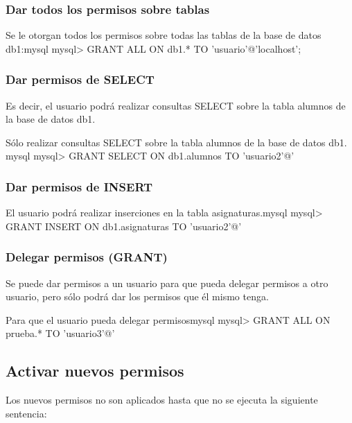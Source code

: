 \subsubsection*{Dar todos los permisos sobre tablas}

\begin{mycode}{Se le otorgan todos los permisos sobre todas las tablas de la base de datos db1:}{mysql}{}
mysql> GRANT ALL ON db1.* TO 'usuario'@'localhost';
\end{mycode}


\subsubsection*{Dar permisos de SELECT}

Es decir, el usuario podrá realizar consultas SELECT sobre la tabla alumnos de la base de datos db1.

\begin{mycode}{Sólo realizar consultas SELECT sobre la tabla alumnos de la base de datos db1.
    }{mysql}{}
mysql> GRANT SELECT ON db1.alumnos TO 'usuario2'@'%
\end{mycode}


\subsubsection*{Dar permisos de INSERT}

\begin{mycode}{El usuario podrá realizar inserciones en la tabla asignaturas.}{mysql}{}
mysql> GRANT INSERT ON db1.asignaturas TO 'usuario2'@'%
\end{mycode}


\subsubsection*{Delegar permisos (GRANT)}

Se puede dar permisos a un usuario para que pueda delegar permisos a otro usuario, pero sólo podrá dar los permisos que él mismo tenga.

\begin{mycode}{Para que el usuario pueda delegar permisos}{mysql}{}
mysql> GRANT ALL ON prueba.* TO 'usuario3'@'%
\end{mycode}



\subsection{Activar nuevos permisos}
Los nuevos permisos no son aplicados hasta que no se ejecuta la siguiente sentencia:

